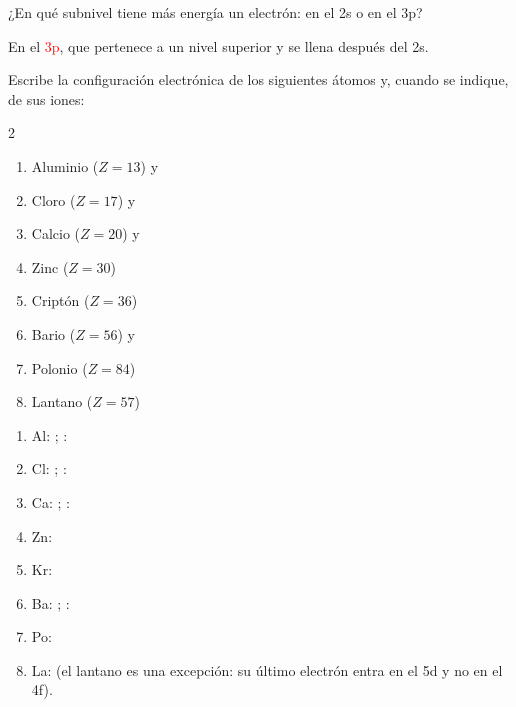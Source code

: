 \begin{exercise}
    ¿En qué subnivel tiene más energía un electrón: en el 2s o en el 3p?
    \begin{solu}
        En el \textcolor{red}{3p}, que pertenece a un nivel superior y se llena después del 2s.
    \end{solu}
\end{exercise}

\begin{exercise}
    Escribe la configuración electrónica de los siguientes átomos y, cuando se indique, de sus iones:
    \begin{multicols}{2}
        \begin{enumerate}[label=\alph*)]
            \item Aluminio (\(Z = 13\)) y 
            \item Cloro (\(Z = 17\)) y 
            \item Calcio (\(Z = 20\)) y 
            \item Zinc (\(Z = 30\))
            \item Criptón (\(Z = 36\))
            \item Bario (\(Z = 56\)) y 
            \item Polonio (\(Z = 84\))
            \item Lantano (\(Z = 57\))
        \end{enumerate}
    \end{multicols}
    \begin{solu}
        \begin{enumerate}[label=\alph*)]
            \item Al: ; \quad {}: 
            \item Cl: ; \quad {}: 
            \item Ca: ; \quad {}: 
            \item Zn: 
            \item Kr: 
            \item Ba: ; \quad {}: 
            \item Po: 
            \item La:  (el lantano es una excepción: su último electrón entra en el 5d y no en el 4f).
        \end{enumerate}
    \end{solu}
\end{exercise}

